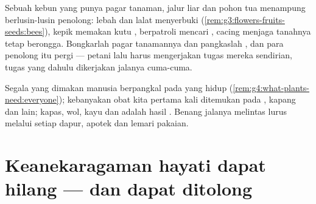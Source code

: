 \begin{example}\label{ex:g5:biodiversity:orchard}
Sebuah kebun  yang punya pagar tanaman, jalur  liar dan pohon
tua menampung berlusin-lusin  penolong: lebah dan lalat 
menyerbuki 
(\cref{rem:g3:flowers-fruits-seeds:bees}), kepik memakan kutu ,
 berpatroli mencari , cacing menjaga tanahnya tetap
berongga. Bongkarlah pagar tanamannya dan pangkaslah , dan
para penolong itu pergi --- petani  lalu harus mengerjakan
tugas mereka sendirian, tugas yang dahulu dikerjakan jalanya
cuma-cuma.
\end{example}

\begin{example}\label{ex:g5:biodiversity:people}
Segala yang dimakan manusia berpangkal pada  yang hidup
(\cref{rem:g4:what-plants-need:everyone}); kebanyakan obat kita
pertama kali ditemukan pada , kapang dan  lain;
kapas, wol, kayu dan  adalah hasil . Benang jalanya
melintas lurus melalui setiap dapur, apotek dan lemari pakaian.
\end{example}

\section{Keanekaragaman hayati dapat hilang --- dan dapat ditolong}

